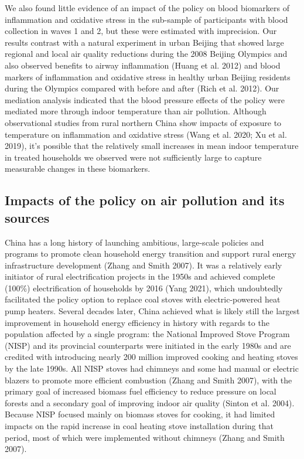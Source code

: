 \documentclass[
  letterpaper,
  DIV=11,
  numbers=noendperiod]{scrartcl}
\begin{document}
We also found little evidence of an impact of the policy on blood
biomarkers of inflammation and oxidative stress in the sub-sample of
participants with blood collection in waves 1 and 2, but these were
estimated with imprecision. Our results contrast with a natural
experiment in urban Beijing that showed large regional and local air
quality reductions during the 2008 Beijing Olympics and also observed
benefits to airway inflammation (Huang et al. 2012) and blood markers of
inflammation and oxidative stress in healthy urban Beijing residents
during the Olympics compared with before and after (Rich et al. 2012).
Our mediation analysis indicated that the blood pressure effects of the
policy were mediated more through indoor temperature than air pollution.
Although observational studies from rural northern China show impacts of
exposure to temperature on inflammation and oxidative stress (Wang et
al. 2020; Xu et al. 2019), it's possible that the relatively small
increases in mean indoor temperature in treated households we observed
were not sufficiently large to capture measurable changes in these
biomarkers.

\subsection{Impacts of the policy on air pollution and its
sources}\label{impacts-of-the-policy-on-air-pollution-and-its-sources}

China has a long history of launching ambitious, large-scale policies
and programs to promote clean household energy transition and support
rural energy infrastructure development (Zhang and Smith 2007). It was a
relatively early initiator of rural electrification projects in the
1950s and achieved complete (100\%) electrification of households by
2016 (Yang 2021), which undoubtedly facilitated the policy option to
replace coal stoves with electric-powered heat pump heaters. Several
decades later, China achieved what is likely still the largest
improvement in household energy efficiency in history with regards to
the population affected by a single program: the National Improved Stove
Program (NISP) and its provincial counterparts were initiated in the
early 1980s and are credited with introducing nearly 200 million
improved cooking and heating stoves by the late 1990s. All NISP stoves
had chimneys and some had manual or electric blazers to promote more
efficient combustion (Zhang and Smith 2007), with the primary goal of
increased biomass fuel efficiency to reduce pressure on local forests
and a secondary goal of improving indoor air quality (Sinton et al.
2004). Because NISP focused mainly on biomass stoves for cooking, it had
limited impacts on the rapid increase in coal heating stove installation
during that period, most of which were implemented without chimneys
(Zhang and Smith 2007).
\end{document}
